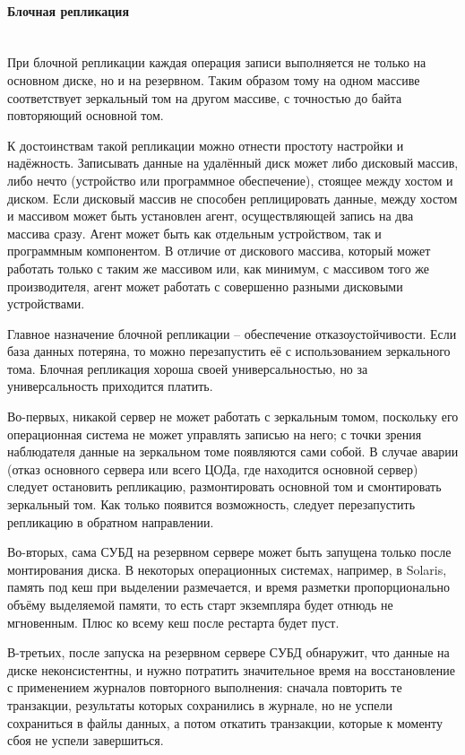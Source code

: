\paragraph{Блочная репликация} ~\\
При блочной репликации каждая операция записи выполняется не только на основном диске, но и на резервном. Таким образом
тому на одном массиве соответствует зеркальный том на другом массиве, с точностью до байта повторяющий основной том.

К достоинствам такой репликации можно отнести простоту настройки и надёжность. Записывать данные на удалённый диск может
либо дисковый массив, либо нечто (устройство или программное обеспечение), стоящее между хостом и диском. Если дисковый
массив не способен реплицировать данные, между хостом и массивом может быть установлен агент, осуществляющей запись на
два массива сразу. Агент может быть как отдельным устройством, так и программным компонентом. В отличие от дискового
массива, который может работать только с таким же массивом или, как минимум, с массивом того же производителя, агент
может работать с совершенно разными дисковыми устройствами.

Главное назначение блочной репликации – обеспечение отказоустойчивости. Если база данных потеряна, то можно
перезапустить её с использованием зеркального тома. Блочная репликация хороша своей универсальностью, но за
универсальность приходится платить.

Во-первых, никакой сервер не может работать с зеркальным томом, поскольку его операционная система не может управлять
записью на него; с точки зрения наблюдателя данные на зеркальном томе появляются сами собой. В случае аварии (отказ
основного сервера или всего ЦОДа, где находится основной сервер) следует остановить репликацию, размонтировать основной
том и смонтировать зеркальный том. Как только появится возможность, следует перезапустить репликацию в обратном
направлении.

Во-вторых, сама СУБД на резервном сервере может быть запущена только после монтирования диска. В некоторых операционных
системах, например, в Solaris, память под кеш при выделении размечается, и время разметки пропорционально объёму
выделяемой памяти, то есть старт экземпляра будет отнюдь не мгновенным. Плюс ко всему кеш после рестарта будет пуст.

В-третьих, после запуска на резервном сервере СУБД обнаружит, что данные на диске неконсистентны, и нужно потратить
значительное время на восстановление с применением журналов повторного выполнения: сначала повторить те транзакции,
результаты которых сохранились в журнале, но не успели сохраниться в файлы данных, а потом откатить транзакции, которые
к моменту сбоя не успели завершиться. \autocite{Replication}

